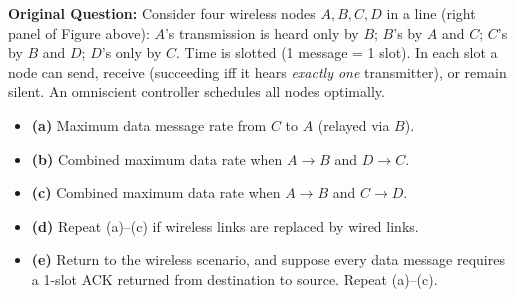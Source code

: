 
\textbf{Original Question:} Consider four wireless nodes $A, B, C, D$ in a line (right panel of Figure above): $A$'s transmission is heard only by $B$; $B$'s by $A$ and $C$; $C$'s by $B$ and $D$; $D$'s only by $C$. Time is slotted (1 message = 1 slot). In each slot a node can send, receive (succeeding iff it hears \emph{exactly one} transmitter), or remain silent. An omniscient controller schedules all nodes optimally.
\begin{itemize}
\item \textbf{(a)} Maximum data message rate from $C$ to $A$ (relayed via $B$).
\item \textbf{(b)} Combined maximum data rate when $A \to B$ and $D \to C$.
\item \textbf{(c)} Combined maximum data rate when $A \to B$ and $C \to D$.
\item \textbf{(d)} Repeat (a)–(c) if wireless links are replaced by wired links.
\item \textbf{(e)} Return to the wireless scenario, and suppose every data message requires a 1-slot ACK returned from destination to source. Repeat (a)–(c).
\end{itemize}

